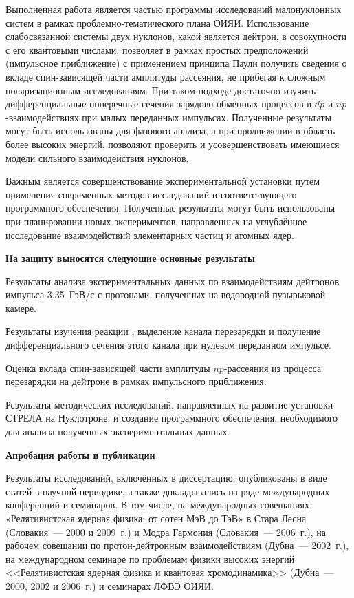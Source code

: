Выполненная работа является частью программы исследований малонуклонных систем
в рамках проблемно-тематического плана ОИЯИ. Использование слабосвязанной
системы двух нуклонов, какой является дейтрон, в совокупности с его квантовыми
числами, позволяет в рамках простых предположений (импульсное приближение)
с применением принципа Паули получить сведения о вкладе спин-зависящей части
амплитуды \np рассеяния, не прибегая к сложным поляризационным исследованиям.
При таком подходе достаточно изучить дифференциальные поперечные сечения
зарядово-обменных процессов в $dp$ и $np$-взаимодействиях при малых переданных
импульсах. Полученные результаты могут быть использованы для фазового анализа,
а при продвижении в область более высоких энергий, позволяют проверить и
усовершенствовать имеющиеся модели сильного взаимодействия нуклонов.

Важным является совершенствование экспериментальной установки путём применения
современных методов исследований и соответствующего программного обеспечения.
Полученные результаты могут быть использованы при планировании новых
экспериментов, направленных на углублённое исследование взаимодействий
элементарных частиц и атомных ядер.

\vspace{2ex}
\noindent \textbf{На защиту выносятся следующие основные результаты}
\begin{list}{}{\leftmargin=1.25em}
\item Результаты анализа экспериментальных данных по взаимодействиям дейтронов
  импульса 3.35~ГэВ/с с протонами, полученных на водородной пузырьковой камере.
\item Результаты изучения реакции \dpfrag, выделение канала перезарядки \dpchex
  и получение дифференциального сечения этого канала при нулевом переданном
  импульсе.
\item Оценка вклада спин-зависящей части амплитуды $np$-рассеяния из процесса
  перезарядки на дейтроне в рамках импульсного приближения.
\item Результаты методических исследований, направленных на развитие установки
  СТРЕЛА на Нуклотроне, и создание программного обеспечения, необходимого для
  анализа полученных экспериментальных данных.
\end{list}

\vspace{2ex}
\noindent \textbf{Апробация работы и публикации}

Результаты исследований, включённых в диссертацию, опубликованы в виде статей в
научной периодике, а также докладывались на ряде международных конференций и
семинаров. В том числе, на международных совещаниях «Релятивистская ядерная
физика: от сотен МэВ до ТэВ» в Стара Лесна (Словакия~--- 2000 и 2009~г.) и Модра
Гармония (Словакия~--- 2006~г.), на рабочем совещании по протон-дейтронным
взаимодействиям (Дубна~--- 2002~г.), на международном семинаре по проблемам
физики высоких энергий <<Релятивистская ядерная физика и квантовая
хромодинамика>> (Дубна~--- 2000, 2002 и 2006~г.) и семинарах ЛФВЭ ОИЯИ.

